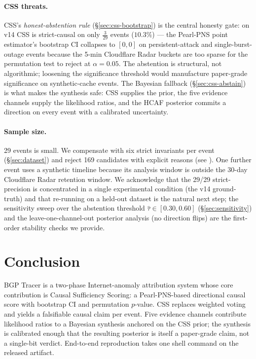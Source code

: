 \documentclass[sigconf,review,nonatbib]{acmart}
\newcommand{\pns}{PNS}
\begin{document}
\paragraph{CSS threats.} CSS's \emph{honest-abstention rule}
(\S\ref{sec:css-bootstrap}) is the central honesty gate: on v14
CSS is strict-causal on only $\frac{3}{29}$ events ($10.3\%$) ---
the Pearl-\pns{} point estimator's bootstrap CI collapses to
$[0,0]$ on persistent-attack and single-burst-outage events
because the 5-min Cloudflare Radar buckets are too sparse for
the permutation test to reject at $\alpha{=}0.05$. The
abstention is structural, not algorithmic; loosening the
significance threshold would manufacture paper-grade
significance on synthetic-cache events. The Bayesian fallback
(\S\ref{sec:css-abstain}) is what makes the synthesis safe: CSS
supplies the prior, the five evidence channels supply the
likelihood ratios, and the HCAF posterior commits a direction
on every event with a calibrated uncertainty.

\paragraph{Sample size.} 29 events is small. We compensate with
six strict invariants per event (\S\ref{sec:dataset}) and
reject 169 candidates with explicit reasons (see
). One further event uses a
synthetic timeline because its analysis window is outside the
30-day Cloudflare Radar retention window. We acknowledge that
the 29/29 strict-precision is concentrated in a single
experimental condition (the v14 ground-truth) and that
re-running on a held-out dataset is the natural next step;
the sensitivity sweep over the abstention threshold
$\hat\tau \in [0.30, 0.60]$ (\S\ref{sec:sensitivity}) and the
leave-one-channel-out posterior analysis (no direction flips)
are the first-order stability checks we provide.

\section{Conclusion}
\label{sec:conclusion}

BGP Tracer is a two-phase Internet-anomaly attribution system whose
core contribution is Causal Sufficiency Scoring: a Pearl-\pns-based
directional causal score with bootstrap CI and permutation
$p$-value. CSS replaces weighted voting and yields a falsifiable
causal claim per event. Five evidence channels contribute
likelihood ratios to a Bayesian synthesis anchored on the CSS prior;
the synthesis is calibrated enough that the resulting posterior is
itself a paper-grade claim, not a single-bit verdict. End-to-end
reproduction takes one shell command on the released artifact.
\end{document}
